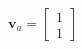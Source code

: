 \documentclass[preview]{standalone}
\begin{document}
\begin{align*}
\mathbf{v}_a = \begin{bmatrix} 1 \\ 1 \end{bmatrix}
\end{align*}
\end{document}
